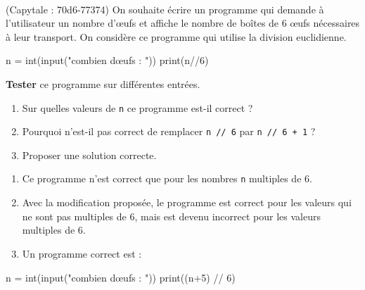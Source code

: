 \documentclass[a4paper,17pt]{extarticle}
\newenvironment{eleve}%
{\begin{activite}\color{noiramu}\\[-0.5cm]}
{\end{activite}}
\providecommand{\tightlist}{%
      \setlength{\itemsep}{0pt}\setlength{\parskip}{0pt}}
\newenvironment{Shaded}{}{}
\newcommand{\DecValTok}[1]{\textcolor[rgb]{0.25,0.63,0.44}{{#1}}}
\newcommand{\StringTok}[1]{\textcolor[rgb]{0.25,0.44,0.63}{{#1}}}
\newcommand{\NormalTok}[1]{{#1}}
\newcommand{\OperatorTok}[1]{\textcolor[rgb]{0.40,0.40,0.40}{{#1}}}
\newcommand{\BuiltInTok}[1]{{#1}}
\begin{document}
\begin{eleve}
    (Capytale : 70d6-77374) On souhaite écrire un programme qui demande à
l'utilisateur un nombre d'œufs et affiche le nombre de boîtes de 6 œufs
nécessaires à leur transport. On considère ce programme qui utilise la
division euclidienne.

\begin{Shaded}
\begin{Highlighting}[]
\NormalTok{n }\OperatorTok{=} \BuiltInTok{int}\NormalTok{(}\BuiltInTok{input}\NormalTok{(}\StringTok{"combien d\textquotesingle{}œufs : "}\NormalTok{))}
\BuiltInTok{print}\NormalTok{(n}\OperatorTok{//}\DecValTok{6}\NormalTok{)}
\end{Highlighting}
\end{Shaded}

\textbf{Tester} ce programme sur différentes entrées.

\begin{enumerate}
\def\labelenumi{\arabic{enumi}.}
\tightlist
\item
  Sur quelles valeurs de \texttt{n} ce programme est-il correct ?
\item
  Pourquoi n'est-il pas correct de remplacer \texttt{n\ //\ 6} par
  \texttt{n\ //\ 6\ +\ 1} ?
\item
  Proposer une solution correcte.
\end{enumerate}
        
        \end{eleve}\begin{reponse}
    \begin{enumerate}
\def\labelenumi{\arabic{enumi}.}
\tightlist
\item
  Ce programme n'est correct que pour les nombres \texttt{n} multiples
  de 6.
\item
  Avec la modification proposée, le programme est correct pour les
  valeurs qui ne sont pas multiples de 6, mais est devenu incorrect pour
  les valeurs multiples de 6.
\item
  Un programme correct est :
\end{enumerate}

\begin{Shaded}
\begin{Highlighting}[]
\NormalTok{n }\OperatorTok{=} \BuiltInTok{int}\NormalTok{(}\BuiltInTok{input}\NormalTok{(}\StringTok{"combien d\textquotesingle{}œufs : "}\NormalTok{))}
\BuiltInTok{print}\NormalTok{((n}\OperatorTok{+}\DecValTok{5}\NormalTok{) }\OperatorTok{//} \DecValTok{6}\NormalTok{)}
\end{Highlighting}
\end{Shaded}

        \end{reponse}

    
    
    
\end{document}
